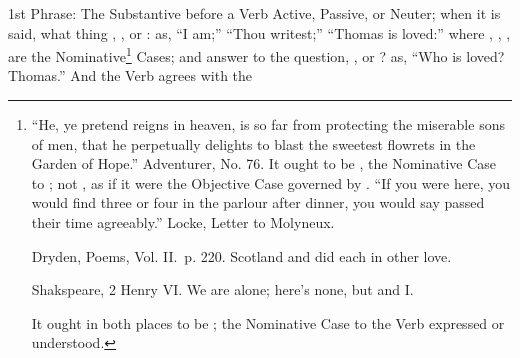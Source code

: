 1st Phrase: The Substantive before a Verb Active, Passive, or Neuter;
when it is said, what thing , , or : as, ``I
am;'' ``Thou writest;'' ``Thomas is loved:'' where , ,
, are the Nominative\footnote{``He,  ye pretend
  reigns in heaven, is so far from protecting the miserable sons of men,
that he perpetually delights to blast the sweetest flowrets in the
Garden of Hope.'' Adventurer, No. 76. It ought to be , the
Nominative Case to ; not , as if it were the
Objective Case governed by . ``If you were here, you would
find three or four in the parlour after dinner,  you would say
passed their time agreeably.'' Locke, Letter to Molyneux.

\begin{aquote}{Dryden, Poems, Vol. II.\ p. 220.}
  Scotland and  did each in other love.
\end{aquote}

\begin{aquote}{Shakspeare, 2 Henry VI.}
  We are alone; here's none, but  and I.
\end{aquote}

It ought in both places to be ; the Nominative Case to the Verb
expressed or understood.} Cases; and answer to the question, ,
or ? as, ``Who is loved? Thomas.'' And the Verb agrees with the
